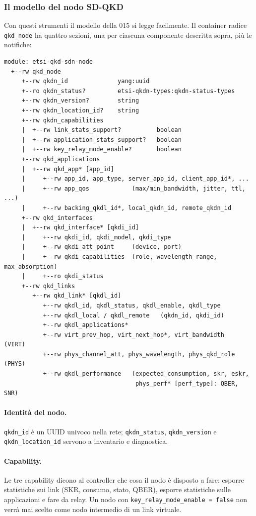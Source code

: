 \subsubsection{Il modello del nodo SD-QKD}

Con questi strumenti il modello della 015 si legge facilmente. Il container
radice \texttt{qkd\_node} ha quattro sezioni, una per ciascuna componente
descritta sopra, più le notifiche:
\begin{lstlisting}
module: etsi-qkd-sdn-node
  +--rw qkd_node
     +--rw qkdn_id              yang:uuid
     +--ro qkdn_status?         etsi-qkdn-types:qkdn-status-types
     +--rw qkdn_version?        string
     +--rw qkdn_location_id?    string
     +--rw qkdn_capabilities
     |  +--rw link_stats_support?          boolean
     |  +--rw application_stats_support?   boolean
     |  +--rw key_relay_mode_enable?       boolean
     +--rw qkd_applications
     |  +--rw qkd_app* [app_id]
     |     +--rw app_id, app_type, server_app_id, client_app_id*, ...
     |     +--rw app_qos            (max/min_bandwidth, jitter, ttl, ...)
     |     +--rw backing_qkdl_id*, local_qkdn_id, remote_qkdn_id
     +--rw qkd_interfaces
     |  +--rw qkd_interface* [qkdi_id]
     |     +--rw qkdi_id, qkdi_model, qkdi_type
     |     +--rw qkdi_att_point     (device, port)
     |     +--rw qkdi_capabilities  (role, wavelength_range, max_absorption)
     |     +--ro qkdi_status
     +--rw qkd_links
        +--rw qkd_link* [qkdl_id]
           +--rw qkdl_id, qkdl_status, qkdl_enable, qkdl_type
           +--rw qkdl_local / qkdl_remote   (qkdn_id, qkdi_id)
           +--rw qkdl_applications*
           +--rw virt_prev_hop, virt_next_hop*, virt_bandwidth   (VIRT)
           +--rw phys_channel_att, phys_wavelength, phys_qkd_role (PHYS)
           +--rw qkdl_performance   (expected_consumption, skr, eskr,
                                     phys_perf* [perf_type]: QBER, SNR)
\end{lstlisting}

\paragraph{Identità del nodo.}
\texttt{qkdn\_id} è un UUID univoco nella rete; \texttt{qkdn\_status},
\texttt{qkdn\_version} e \texttt{qkdn\_location\_id} servono a inventario e
diagnostica.

\paragraph{Capability.}
Le tre capability dicono al controller che cosa il nodo è disposto a fare:
esporre statistiche sui link (SKR, consumo, stato, QBER), esporre
statistiche sulle applicazioni e fare da relay. Un nodo con
\texttt{key\_relay\_mode\_enable = false} non verrà mai scelto come nodo
intermedio di un link virtuale.

